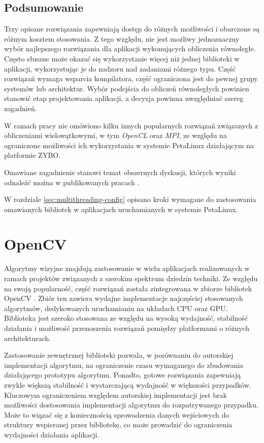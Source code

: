 \subsection*{Podsumowanie}

Trzy opisane rozwiązania zapewniają dostęp do różnych możliwości i obarczone są różnym kosztem stosowania. 
Z tego względu, nie jest możliwy jednoznaczny wybór najlepszego rozwiązania dla aplikacji wykonujących obliczenia równoległe. 
Często słuszne może okazać się wykorzystanie więcej niż jednej biblioteki w aplikacji, wykorzystując je do nadzoru nad zadaniami różnego typu. 
Część rozwiązań wymaga wsparcia kompilatora, część ograniczona jest do pewnej grupy systemów lub architektur. 
Wybór podejścia do obliczeń równoległych powinien stanowić etap projektowania aplikacji, a decyzja powinna uwzględniać szereg zagadnień.

W ramach pracy nie omówiono kilku innych popularnych rozwiązań związanych z obliczeniami wielowątkowymi, w tym \emph{OpenCL} oraz \emph{MPI}, ze względu na ograniczone możliwości ich wykorzystania w systemie PetaLinux działającym na platformie ZYBO.

Omawiane zagadnienie stanowi temat obszernych dyskusji, których wyniki odnaleźć można w publikowanych pracach \cite{choosing-thread-framework,Kegel2009}. %

W rozdziale \ref{sec:multithreading-config} opisano kroki wymagane do zastosowania omawianych bibliotek w aplikacjach uruchamianych w systemie PetaLinux.



\section{OpenCV}
\label{sec:opencv-lib}

Algorytmy wizyjne znajdują zastosowanie w wielu aplikacjach realizowanych w ramach projektów związanych z szerokim spektrum dziedzin techniki. 
Ze względu na swoją popularność, część rozwiązań została zintegrowana w zbiorze bibliotek OpenCV \cite{opencv-library}. 
Zbiór ten zawiera wydajne implementacje najczęściej stosowanych algorytmów, dedykowanych uruchamianiu na układach CPU oraz GPU. %
Biblioteka jest szeroko stosowana ze względu na wysoką wydajność, stabilność działania i możliwość przenoszenia rozwiązań pomiędzy platformami o różnych architekturach.

Zastosowanie zewnętrznej biblioteki pozwala, w porównaniu do autorskiej implementacji algorytmu, na ograniczenie czasu wymaganego do zbudowania działającego prototypu algorytmu. 
Ponadto, gotowe rozwiązania zapewniają zwykle większą stabilność i wystarczającą wydajność w większości przypadków. 
Kluczowym ograniczeniem względem autorskiej implementacji jest brak możliwości dostosowania implementacji algorytmu do rozpatrywanego przypadku. %
Może to wiązać się z koniecznością sprowadzenia danych wejściowych do struktury wspieranej przez bibliotekę, co może prowadzić do ograniczenia wydajności działania aplikacji.

